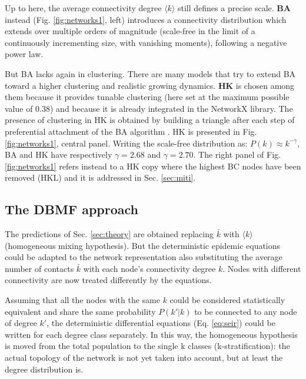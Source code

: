 \documentclass[DIV=12, BCOR=0pt]{scrartcl}  %
\begin{document}
  
  Up to here, the average connectivity degree $\langle k \rangle$ still defines a precise scale. \textbf{BA} instead (Fig. \ref{fig:networks1}, left) introduces a connectivity distribution which extends over multiple orders of magnitude (scale-free in the limit of a continuously incrementing size, with vanishing moments), following a negative power law.
  
  But BA lacks again in clustering. There are many models that try to extend BA toward a higher clustering and realistic growing dynamics. \textbf{HK} is chosen among them because it provides tunable clustering (here set at the maximum possible value of $0.38$) and because it is already integrated in the NetworkX library. The presence of clustering in HK is obtained by building a triangle after each step of preferential attachment of the BA algorithm \citep{Holme}.
  HK is presented in Fig. \ref{fig:networks1}, central panel. Writing the scale-free distribution as: $P(k) \approx k^{- \gamma}$, BA and HK have respectively $\gamma = 2.68$ and $\gamma = 2.70$.
  The right panel of Fig. \ref{fig:networks1} refers instead to a HK copy where the highest BC nodes have been removed (HKL) and it is addressed in Sec. \ref{sec:miti}.
  
  
  \subsection{The DBMF approach} 
  The predictions of Sec. \ref{sec:theory} are obtained replacing $\bar{k}$ with $\langle k \rangle$ (homogeneous mixing hypothesis). But the deterministic epidemic equations could be adapted to the network representation also substituting the average number of contacts $\bar{k}$ with each node's connectivity degree $k$. Nodes with different connectivity are now treated differently by the equations.
  
  Assuming that all the nodes with the same $k$ could be considered statistically equivalent and share the same probability $P(k'|k)$ to be connected to any node of degree $k'$, the deterministic differential equations (Eq. \ref{eq:seir}) could be written for each degree class separately.
  In this way, the homogeneous hypothesis is moved from the total population to the single k classes (k-stratification): the actual topology of the network is not yet taken into account, but at least the degree distribution is. 
  
\end{document}
